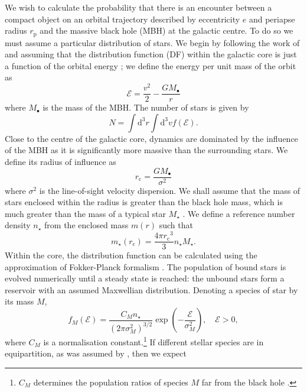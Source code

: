 \documentclass[useAMS,usedcolumn,usegraphicx,usenatbib]{mn2e}
\newcommand{\sub}[1]{\ensuremath{_\mathrm{#1}}}
\newcommand{\dd}{\ensuremath{\mathrm{d}}}
\begin{document}
We wish to calculate the probability that there is an encounter between a compact object on an orbital trajectory described by eccentricity $e$ and periapse radius $r\sub{p}$ and the massive black hole (MBH) at the galactic centre. To do so we must assume a particular distribution of stars. We begin by following the work of \citet{Bahcall1976, Bahcall1977} and assuming that the distribution function (DF) within the galactic core is just a function of the orbital energy \citep{Shapiro1978}; we define the energy per unit mass of the orbit as
\begin{equation}
\mathcal{E} = \frac{v^2}{2} - \frac{GM_\bullet}{r}
\end{equation}
where $M_\bullet$ is the mass of the MBH. The number of stars is given by
\begin{equation}
N = \int \dd^3r \int \dd^3v f(\mathcal{E}).
\end{equation}
Close to the centre of the galactic core, dynamics are dominated by the influence of the MBH as it is significantly more massive than the surrounding stars. We define its radius of influence as \citep{Frank1976}
\begin{equation}
r\sub{c} = \frac{GM_\bullet}{\sigma^2}
\label{eq:r_c}
\end{equation}
where $\sigma^2$ is the line-of-sight velocity dispersion. We shall assume that the mass of stars enclosed within the radius is greater than the black hole mass, which is much greater than the mass of a typical star $M_\star$ \citep{Bahcall1976}. We define a reference number density $n_\star$ from the enclosed mass $m(r)$ such that
\begin{equation}
m_\star(r\sub{c}) = \frac{4\pi r\sub{c}^3}{3}n_\star M_\star.
\end{equation}
Within the core, the distribution function can be calculated using the approximation of Fokker-Planck formalism \citep[section 7.4]{Binney2008}. The population of bound stars is evolved numerically until a steady state is reached: the unbound stars form a reservoir with an assumed Maxwellian distribution. Denoting a species of star by its mass $M$,
\begin{equation}
f_M(\mathcal{E}) = \frac{C_M n_\star}{(2\pi\sigma_M^2)^{3/2}} \exp\left(-\frac{\mathcal{E}}{\sigma_M^2}\right),\quad\mathcal{E} > 0,
\label{eq:Unbound_DF}
\end{equation}
where $C_M$ is a normalisation constant.\footnote{$C_M$ determines the population ratios of species $M$ far from the black hole \citep{Alexander2009}.} If different stellar species are in equipartition, as was assumed by \citet{Bahcall1976, Bahcall1977}, then we expect
\end{document}
